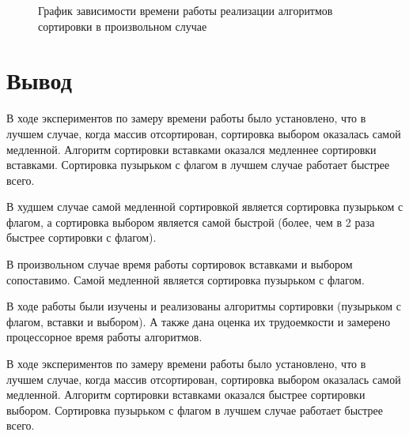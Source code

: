 \documentclass[utf8x, 12pt]{G7-32}
\begin{document}
    \begin{figure}[h!]
        \centering
        \caption{График зависимости времени работы реализации алгоритмов сортировки в произвольном случае} 
        \label{graph:test:random}
    \end{figure}

\newpage


\section{Вывод}
 В ходе экспериментов по замеру времени работы было установлено, что 
        в лучшем случае, когда массив отсортирован, сортировка выбором оказалась самой медленной.
        Алгоритм сортировки вставками оказался медленнее сортировки вставками.
        Сортировка пузырьком с флагом в лучшем случае работает быстрее всего.

        В худшем случае самой медленной сортировкой является сортировка пузырьком с флагом,
        а сортировка выбором является самой быстрой (более, чем в 2 раза быстрее сортировки с флагом).

        В произвольном случае время работы сортировок вставками и выбором сопоставимо.
        Самой медленной является сортировка пузырьком с флагом.


\Conclusion
    В ходе работы были изучены и реализованы алгоритмы сортировки
    (пузырьком с флагом, вставки и выбором). А также дана оценка их трудоемкости и замерено процессорное время работы алгоритмов.
    
    В ходе экспериментов по замеру времени работы было установлено, что 
    в лучшем случае, когда массив отсортирован, сортировка выбором оказалась самой медленной.
    Алгоритм сортировки вставками оказался быстрее сортировки выбором.
    Сортировка пузырьком с флагом в лучшем случае работает быстрее всего.
\end{document}
